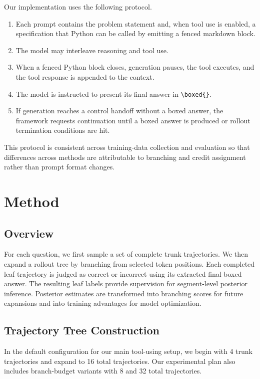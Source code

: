 \documentclass{article}
\begin{document}
Our implementation uses the following protocol.
\begin{enumerate}
    \item Each prompt contains the problem statement and, when tool use is enabled, a specification that Python can be called by emitting a fenced markdown block.
    \item The model may interleave reasoning and tool use.
    \item When a fenced Python block closes, generation pauses, the tool executes, and the tool response is appended to the context.
    \item The model is instructed to present its final answer in \texttt{\textbackslash boxed\{\}}.
    \item If generation reaches a control handoff without a boxed answer, the framework requests continuation until a boxed answer is produced or rollout termination conditions are hit.
\end{enumerate}

This protocol is consistent across training-data collection and evaluation so that differences across methods are attributable to branching and credit assignment rather than prompt format changes.

\section{Method}
\subsection{Overview}
For each question, we first sample a set of complete trunk trajectories. We then expand a rollout tree by branching from selected token positions. Each completed leaf trajectory is judged as correct or incorrect using its extracted final boxed answer. The resulting leaf labels provide supervision for segment-level posterior inference. Posterior estimates are transformed into branching scores for future expansions and into training advantages for model optimization.

\subsection{Trajectory Tree Construction}
In the default configuration for our main tool-using setup, we begin with 4 trunk trajectories and expand to 16 total trajectories. Our experimental plan also includes branch-budget variants with 8 and 32 total trajectories.
\end{document}

